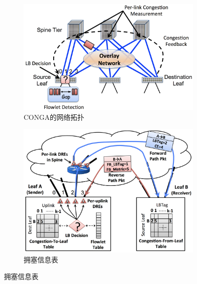 \begin{itemize}
\begin{figure}[htb!]
\centering
\begin{subfigure}{0.45\textwidth}
     \includegraphics[width=\textwidth]{figure/CONGA_system_archi.png}
    \caption{CONGA的网络拓扑}
\end{subfigure}\hspace{2em}
\begin{subfigure}{0.45\textwidth}
    \includegraphics[width=\textwidth]{figure/CONGA_flowlet.png}
    \caption{拥塞信息表}
    

\end{subfigure}
\end{figure}
\end{itemize}
